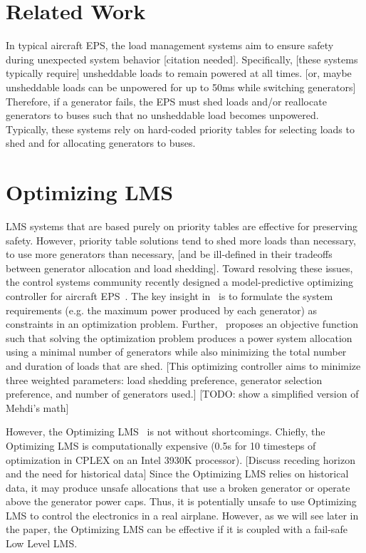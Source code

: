 \documentclass{acm_proc_article-sp}
\begin{document}
\section{Related Work}
\label{sec:related-work}
In typical aircraft EPS, the load management systems aim to ensure safety during unexpected system behavior [citation needed].
Specifically, [these systems typically require] unsheddable loads to remain powered at all times. [or, maybe unsheddable loads can be unpowered for up to 50ms while switching generators]
Therefore, if a generator fails, the EPS must shed loads and/or reallocate generators to buses such that no unsheddable load becomes unpowered.
Typically, these systems rely on hard-coded priority tables for selecting loads to shed and for allocating generators to buses.

\section{Optimizing LMS}
\label{sec:optimizing-LMS}
LMS systems that are based purely on priority tables are effective for preserving safety.
However, priority table solutions tend to shed more loads than necessary, to use more generators than necessary, [and be ill-defined in their tradeoffs between generator allocation and load shedding].
Toward resolving these issues, the control systems community recently designed a model-predictive optimizing controller for aircraft EPS~\cite{mehdi}.
The key insight in~\cite{mehdi} is to formulate the system requirements (e.g. the maximum power produced by each generator) as constraints in an optimization problem.
Further,~\cite{mehdi} proposes an objective function such that solving the optimization problem produces a power system allocation using a minimal number of generators while also minimizing the total number and duration of loads that are shed. 
[This optimizing controller aims to minimize three weighted parameters: load shedding preference, generator selection preference, and number of generators used.]
[TODO: show a simplified version of Mehdi's math]

However, the Optimizing LMS~\cite{mehdi} is not without shortcomings.
Chiefly, the Optimizing LMS is computationally expensive (0.5s for 10 timesteps of optimization in CPLEX on an Intel 3930K processor).
[Discuss receding horizon and the need for historical data]
Since the Optimizing LMS relies on historical data, it may produce unsafe allocations that use a broken generator or operate above the generator power caps.
Thus, it is potentially unsafe to use Optimizing LMS to control the electronics in a real airplane. 
However, as we will see later in the paper, the Optimizing LMS can be effective if it is coupled with a fail-safe Low Level LMS.
\end{document}
